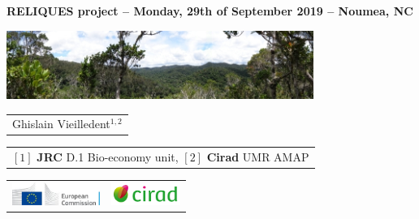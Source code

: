 {

  \begin{frame}
    \begin{center}
        \small{\textbf{RELIQUES project -- Monday, 29th of September 2019 -- Noumea, NC}}
    \end{center}
    \vspace{-0.5cm}
    \titlepage %
    \vspace{-2.5cm}
    \begin{center}
      \includegraphics[width=10cm]{figs/Banniere.png}
    \end{center}
    \begin{center}

        \begin{tabular}{c}
          Ghislain Vieilledent$^{1,2}$
        \end{tabular}

      \vspace{0.25cm}

      {\small
        \begin{tabular}{c}
          $[1]$ \textbf{JRC} D.1 Bio-economy unit,
          $[2]$ \textbf{Cirad} UMR AMAP
        \end{tabular}
      }

      \vspace{0.25cm}

      \begin{tabular}{C{3cm}C{3cm}}
        \includegraphics[height=0.75cm]{figs/Logo-JRC.jpg} &
        \includegraphics[height=0.75cm]{figs/Logo-Cirad.png}\\
      \end{tabular}

    \end{center}
    
  \end{frame}
}
\setcounter{framenumber}{0}

